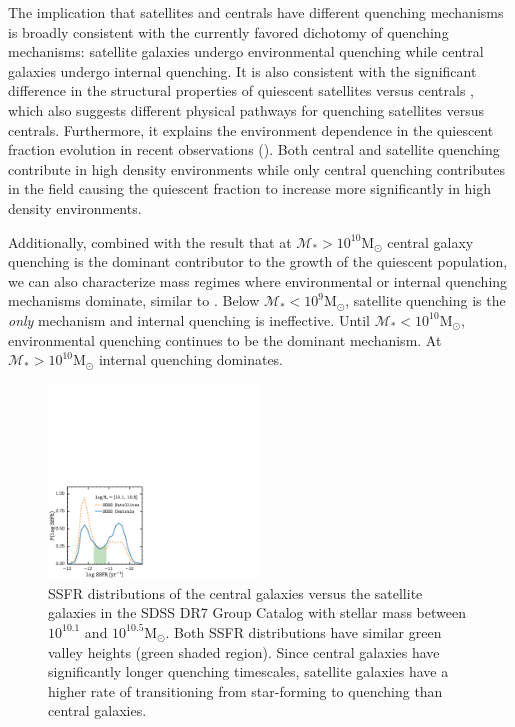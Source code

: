 \documentclass[iop,apj,tighten,twocolappendix,numberedappendix]{emulateapj}
\begin{document}
The implication that satellites and centrals have different quenching 
mechanisms is broadly consistent with the currently favored dichotomy of 
quenching mechanisms: satellite galaxies undergo environmental 
quenching while central galaxies undergo internal quenching. 
It is also consistent with the significant difference in the structural 
properties of quiescent satellites versus centrals \citep{Woo:2016aa}, 
which also suggests different physical pathways for quenching
satellites versus centrals.
Furthermore, it explains the environment dependence in the quiescent fraction 
evolution in recent observations (\citealt{Hahn:2015aa, Darvish:2016aa}). 
Both central and satellite quenching contribute in high density 
environments while only central quenching contributes in the field 
causing the quiescent fraction to increase more significantly in high
density environments. 

Additionally, combined with the \cite{Wetzel:2013aa} 
result that at $\mathcal{M}_* > 10^{10} \mathrm{M}_\odot$ central 
galaxy quenching is the dominant contributor to the growth of the 
quiescent population, we can also characterize mass regimes where 
environmental or internal quenching mechanisms dominate, similar to 
\cite{Peng:2010aa}. 
Below $\mathcal{M}_* < 10^{9} \mathrm{M}_\odot$, satellite quenching 
is the {\em only} mechanism \citep{Geha:2012aa} and internal quenching 
is ineffective. Until $\mathcal{M}_* < 10^{10} \mathrm{M}_\odot$, 
environmental quenching continues to be the dominant mechanism. At 
$\mathcal{M}_* > 10^{10} \mathrm{M}_\odot$ internal quenching 
dominates.

\begin{figure}
\begin{center}
\includegraphics[width=0.5\textwidth]{figs/SSFR_SDSS.pdf}
\caption{SSFR distributions of the central galaxies
versus the satellite galaxies in the SDSS DR7 Group Catalog with
stellar mass between $10^{10.1}$ and $10^{10.5}\mathrm{M}_\odot$. 
Both SSFR distributions have similar green valley heights 
(green shaded region). Since
central galaxies have significantly longer quenching timescales, 
satellite galaxies have a higher rate of transitioning from 
star-forming to quenching than central galaxies.}
\label{fig:sdss_censat_ssfr}
\end{center}
\end{figure}
\end{document}
